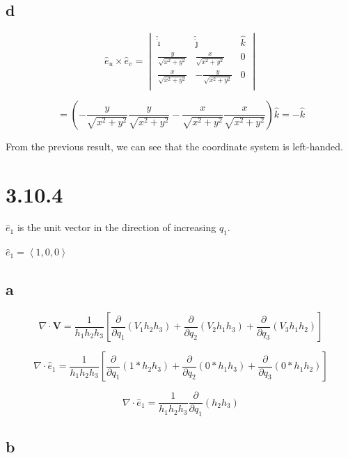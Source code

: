 \documentclass[12pt]{article}
\begin{document}
\subsection{d}

\[
    \hat{e}_u \times \hat{e}_v =
    \begin{vmatrix}
        \hat{\dot{\imath}}         & \hat{\dot{\jmath}}          & \hat{k} \\
        \frac{y}{\sqrt{x^2 + y^2}} & \frac{x}{\sqrt{x^2 + y^2}}  & 0       \\
        \frac{x}{\sqrt{x^2 + y^2}} & -\frac{y}{\sqrt{x^2 + y^2}} & 0       \\
    \end{vmatrix}
\]

\[
    = \left( - \frac{y}{\sqrt{x^2 + y^2}} \frac{y}{\sqrt{x^2 + y^2}} - \frac{x}{\sqrt{x^2 + y^2}} \frac{x}{\sqrt{x^2 + y^2}} \right)\hat{k} = -\hat{k}
\]

From the previous result, we can see that the coordinate system is left-handed.

\section{3.10.4}

\(\hat{e}_1\) is the unit vector in the direction of increasing \(q_1\).

\(\hat{e}_1 = \left\langle1, 0, 0\right\rangle \)

\subsection{a}

\[
    \nabla \cdot \textbf{V} = \frac{1}{h_1 h_2 h_3}\left[\frac{\partial}{\partial q_1}\left(V_1 h_2 h_3\right) + \frac{\partial}{\partial q_2}\left(V_2 h_1 h_3\right) + \frac{\partial}{\partial q_3}\left(V_3 h_1 h_2\right)\right]
\]

\[
    \nabla \cdot \hat{e}_1 = \frac{1}{h_1 h_2 h_3}\left[\frac{\partial}{\partial q_1}\left(1 * h_2 h_3\right) + \frac{\partial}{\partial q_2}\left(0 * h_1 h_3\right) + \frac{\partial}{\partial q_3}\left(0 * h_1 h_2\right)\right]
\]

\[
    \nabla \cdot \hat{e}_1 = \frac{1}{h_1 h_2 h_3} \frac{\partial}{\partial q_1}\left(h_2 h_3\right)
\]

\subsection{b}
\end{document}
